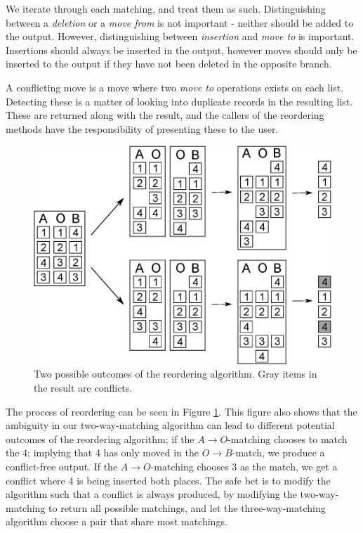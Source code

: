 \documentclass[11pt]{article}
\begin{document}
We iterate through each matching, and treat them as such. Distinguishing between a \textit{deletion} or a \textit{move from} is not important - neither should be added to the output. However, distinguishing between \textit{insertion} and \textit{move to} is important. Insertions should always be inserted in the output, however moves should only be inserted to the output if they have not been deleted in the opposite branch. 

A conflicting move is a move where two \textit{move to} operations exists on each list. Detecting these is a matter of looking into duplicate records in the resulting list. These are returned along with the result, and the callers of the reordering methods have the responsibility of presenting these to the user.

\begin{figure}
   \centerline{\includegraphics[scale=0.55]{drawings/eps/reordering.eps}}
   \caption{Two possible outcomes of the reordering algorithm. Gray items in the result are conflicts.}
   \label{Reordering}
\end{figure}

The process of reordering can be seen in Figure \ref{Reordering}. This figure also shows that the ambiguity in our two-way-matching algorithm can lead to different potential outcomes of the reordering algorithm; if the $A \rightarrow O$-matching chooses to match the 4; implying that 4 has only moved in the $O \rightarrow B$-match, we produce a conflict-free output. If the $A \rightarrow O$-matching chooses 3 as the match, we get a conflict where 4 is being inserted both places. The safe bet is to modify the algorithm such that a conflict is always produced, by modifying the two-way-matching to return all possible matchings, and let the three-way-matching algorithm choose a pair that share most matchings.
\end{document}
